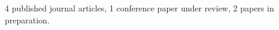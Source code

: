 \documentclass[11pt]{article}
\begin{document}
4 published journal articles, 1 conference paper under review, 2 papers in preparation.








\end{document}
